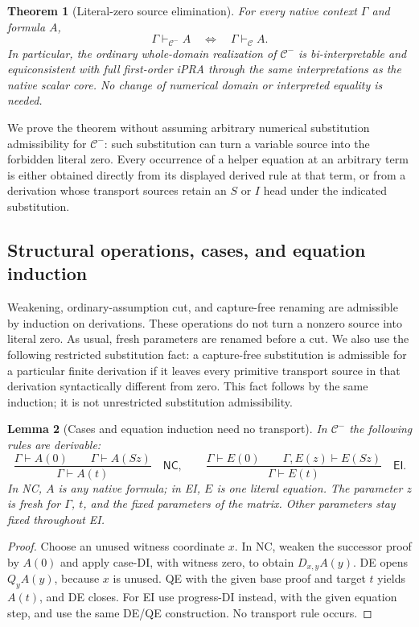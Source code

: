 \documentclass[11pt,letterpaper]{article}
\newtheorem{theorem}{Theorem}[section]
\newtheorem{lemma}[theorem]{Lemma}
\theoremstyle{definition}
\begin{document}
\begin{theorem}[Literal-zero source elimination]
\label{zs:main}
For every native context $\Gamma$ and formula $A$,
\[
 \Gamma\vdash_{\mathcal C^{-}}A
 \quad\Longleftrightarrow\quad
 \Gamma\vdash_{\mathcal C}A.
\]
In particular, the ordinary whole-domain realization of
$\mathcal C^{-}$ is bi-interpretable and equiconsistent with full
first-order iPRA through the same interpretations as the native scalar
core. No change of numerical domain or interpreted equality is needed.
\end{theorem}

We prove the theorem without assuming arbitrary numerical substitution
admissibility for $\mathcal C^{-}$: such substitution can turn a variable
source into the forbidden literal zero. Every occurrence of a helper
equation at an arbitrary term is either obtained directly from its
displayed derived rule at that term, or from a derivation whose transport
sources retain an $S$ or $I$ head under the indicated substitution.

\subsection{Structural operations, cases, and equation induction}

Weakening, ordinary-assumption cut, and capture-free renaming are
admissible by induction on derivations. These operations do not turn a
nonzero source into literal zero. As usual, fresh parameters are renamed
before a cut. We also use the following restricted substitution fact:
a capture-free substitution is admissible for a particular finite
derivation if it leaves every primitive transport source in that
derivation syntactically different from zero. This fact follows by the
same induction; it is not unrestricted substitution admissibility.

\begin{lemma}[Cases and equation induction need no transport]
\label{zs:cases-induction}
In $\mathcal C^{-}$ the following rules are derivable:
\[
 \frac{\Gamma\vdash A(0)\qquad\Gamma\vdash A(Sz)}
      {\Gamma\vdash A(t)}\quad\mathsf{NC},
 \qquad
 \frac{\Gamma\vdash E(0)\qquad\Gamma,E(z)\vdash E(Sz)}
      {\Gamma\vdash E(t)}\quad\mathsf{EI}.
\]
In NC, $A$ is any native formula; in EI, $E$ is one literal equation.
The parameter $z$ is fresh for $\Gamma$, $t$, and the fixed parameters
of the matrix. Other parameters stay fixed throughout EI.
\end{lemma}
\begin{proof}
Choose an unused witness coordinate $x$. In NC, weaken the successor
proof by $A(0)$ and apply case-DI, with witness zero, to obtain
$D_{x,y}A(y)$. DE opens $Q_yA(y)$, because $x$ is unused. QE with the
given base proof and target $t$ yields $A(t)$, and DE closes.
For EI use progress-DI instead, with the given equation step, and use
the same DE/QE construction. No transport rule occurs.
\end{proof}
\end{document}
